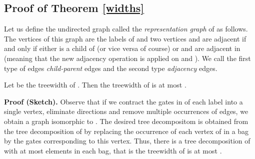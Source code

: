 \documentclass{llncs}
\begin{document}
\subsection{Proof of Theorem \ref{widths}} \label{twidth}
\begin{comment}
A direct construction of tree decomposition of  is quite a cumbersome task.
Indeed, the topology of  essentially involves three 'similar' structures induced by 
 and  gates and it would not look very elegant to repeat the same of reasoning for each
of these parts. We follow, in our opinion, a more elegant approach. We introduce a graph retaining
the essential structure of , quite easily show that the treewidth of  is at most 
times as the treewidth of this graph and then show tat the treewidth of this graph is at most
twice as the width of . The result immediately follows from the combination of these
two statements.
\end{comment}

Let us define the undirected graph  called the
\emph{representation graph} of  as follows. The vertices of this graph are the labels of  
and two vertices  and  are adjacent if and only if either  is a child of  (or vice versa of course) or  and  are adjacent in 
 (meaning that the new adjacency operation is applied on  and ).
We call the first type of edges \emph{child-parent} edges
and the second type \emph{adjacency} edges.


 
\begin{lemma} \label{widthf}
Let  be the treewidth of .
Then the treewidth of  is at most .
\end{lemma}

{\bf Proof (Sketch).} Observe that if we contract the gates in  of each label into a single vertex,
eliminate directions and remove multiple occurrences of edges, we obtain a graph isomorphic to .
The desired tree decompositom is obtained from the tree decomposition of  by replacing the occurrence of each vertex
of  in a bag by the gates corresponding to this vertex. Thus, there is a tree decomposition of 
with at most  elements in each bag, that is the treewidth of  is at most . 
\end{document}
